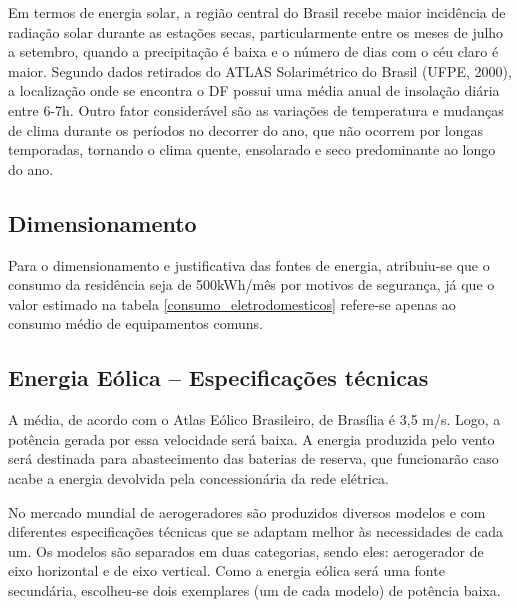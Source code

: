 	Em termos de energia solar, a região central do Brasil recebe maior incidência de radiação solar durante as estações secas, particularmente entre os meses de julho a setembro, quando a precipitação é baixa e o número de dias com o céu claro é maior. Segundo dados retirados do ATLAS Solarimétrico do Brasil (UFPE, 2000), a localização onde se encontra o DF possui uma média anual de insolação diária entre 6-7h. Outro fator considerável são as variações de temperatura e mudanças de clima durante os períodos no decorrer do ano, que não ocorrem por longas temporadas, tornando o clima quente, ensolarado e seco predominante ao longo do ano.

\subsection{Dimensionamento}

	Para o dimensionamento e justificativa das fontes de energia, atribuiu-se que o consumo da residência seja de 500kWh/mês por motivos de segurança, já que o valor estimado na tabela \ref{consumo_eletrodomesticos} refere-se apenas ao consumo médio de equipamentos comuns.

\subsection{Energia Eólica -- Especificações técnicas}

	A média, de acordo com o Atlas Eólico Brasileiro, de Brasília é 3,5 m/s. Logo, a potência gerada por essa velocidade será baixa. A energia produzida pelo vento será destinada para abastecimento das baterias de reserva, que funcionarão caso acabe a energia devolvida pela concessionária da rede elétrica.

	No mercado mundial de aerogeradores são produzidos diversos modelos e com diferentes especificações técnicas que se adaptam melhor às necessidades de cada um. Os modelos são separados em duas categorias, sendo eles: aerogerador de eixo horizontal e de eixo vertical. Como a energia eólica será uma fonte secundária, escolheu-se dois exemplares (um de cada modelo) de potência baixa.

